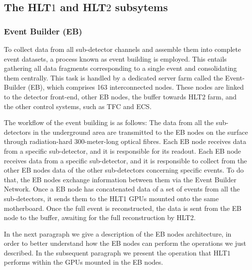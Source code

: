 \subsection{The HLT$1$ and HLT$2$ subsytems}\label{sec:HLT1eHLT2}
\subsubsection{Event Builder (EB)}
To collect data from all sub-detector channels and assemble them into complete event datasets, a process known as event building is employed. This entails gathering all data fragments corresponding to a single event and consolidating them centrally. This task is handled by a dedicated server farm called the Event-Builder (EB), which comprises 163 interconnected nodes. These nodes are linked to the detector front-end, other EB nodes, the buffer towards HLT$2$ farm, and the other control systems, such as TFC and ECS.

The workflow of the event building is as follows: 
The data from all the sub-detectors in the underground area are transmitted to the EB nodes on the surface through radiation-hard 300-meter-long optical fibres. Each EB node receives data from a specific sub-detector, and it is responsible for its readout. Each EB node receives data from a specific sub-detector, and it is responsible to collect from the other EB nodes data of the other sub-detectors concerning specific events. To do that, the EB nodes exchange information between them via the Event Builder Network. Once a EB node has concatenated data of a set of events from all the sub-detectors, it sends them to the HLT1 GPUs mounted onto the same motherboard.
Once the full event is reconstructed, the data is sent from the EB node to the buffer, awaiting for the full reconstruction by HLT2. 

In the next paragraph we give a description of the EB nodes architecture, in order to better understand how the EB nodes can perform the operations we just described. In the subsequent paragraph we present the operation that HLT$1$ performs within the GPUs mounted in the EB nodes. 

